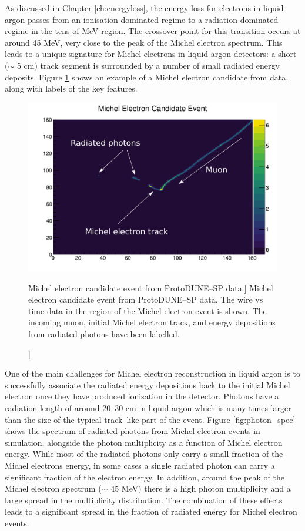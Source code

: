 As discussed in Chapter \ref{ch:energyloss}, the energy loss for electrons in
liquid argon passes from an ionisation dominated regime to a radiation dominated
regime in the tens of MeV region. The crossover point for this transition occurs
at around 45 MeV, very close to the peak of the Michel electron spectrum. This
leads to a unique signature for Michel electrons in liquid argon detectors: a
short ($\sim$ 5 cm) track segment is surrounded by a number of small radiated 
energy deposits. Figure \ref{fig:michel_event} shows an example of a Michel 
electron candidate from \protodune{} data, along with labels of the key 
features.

\begin{figure}
	\centering
	\includegraphics[width=\textwidth]{figures/michel_candidate_labelled.pdf}
	\caption
	[Michel electron candidate event from ProtoDUNE--SP data.]
	{Michel electron candidate event from ProtoDUNE--SP data. The wire vs time
	data in the region of the Michel electron event is shown. The incoming muon,
	initial Michel electron track, and energy depositions from radiated photons
	have been labelled.}
	\label{fig:michel_event}
\end{figure}

One of the main challenges for Michel electron reconstruction in liquid argon is
to successfully associate the radiated energy depositions back to the initial
Michel electron once they have produced ionisation in the detector. Photons have
a radiation length of around 20--30 cm in liquid argon which is many times
larger than the size of the typical track--like part of the event. Figure 
\ref{fig:photon_spec} shows the spectrum of radiated photons from Michel 
electron events in \protodune{} simulation, alongside the photon multiplicity 
as a function of Michel electron energy. While most of the radiated photons 
only carry a small fraction of the Michel electrons energy, in some cases a 
single radiated photon can carry a significant fraction of the electron 
energy. In addition, around the peak of the Michel electron spectrum ($\sim$
45 MeV) there is a high photon multiplicity and a large spread in the
multiplicity distribution. The combination of these effects leads to a
significant spread in the fraction of radiated energy for Michel electron
events.

